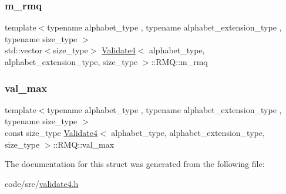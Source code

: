 \mbox{\label{struct_validate4_1_1_r_m_q_abf525030d892825a6ef20c45eafaae2b}} 
\subsubsection{\texorpdfstring{m\+\_\+rmq}{m\_rmq}}
{\footnotesize\ttfamily template$<$typename alphabet\+\_\+type , typename alphabet\+\_\+extension\+\_\+type , typename size\+\_\+type $>$ \\
std\+::vector$<$size\+\_\+type$>$ \hyperlink{class_validate4}{Validate4}$<$ alphabet\+\_\+type, alphabet\+\_\+extension\+\_\+type, size\+\_\+type $>$\+::R\+M\+Q\+::m\+\_\+rmq\hspace{0.3cm}{\ttfamily [private]}}

\mbox{\label{struct_validate4_1_1_r_m_q_a45aa4f738281304a3f6bd5b9d78ef712}} 
\subsubsection{\texorpdfstring{val\+\_\+max}{val\_max}}
{\footnotesize\ttfamily template$<$typename alphabet\+\_\+type , typename alphabet\+\_\+extension\+\_\+type , typename size\+\_\+type $>$ \\
const size\+\_\+type \hyperlink{class_validate4}{Validate4}$<$ alphabet\+\_\+type, alphabet\+\_\+extension\+\_\+type, size\+\_\+type $>$\+::R\+M\+Q\+::val\+\_\+max\hspace{0.3cm}{\ttfamily [private]}}



The documentation for this struct was generated from the following file\+:\begin{DoxyCompactItemize}
\item 
code/src/\hyperlink{validate4_8h}{validate4.\+h}\end{DoxyCompactItemize}
